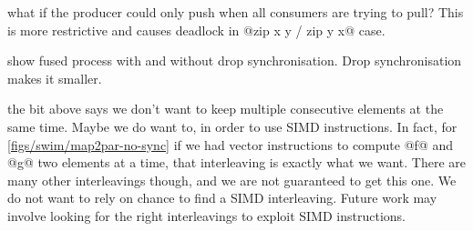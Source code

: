  what if the producer could only push when all consumers are trying to pull?
This is more restrictive and causes deadlock in @zip x y / zip y x@ case.

 show fused process with and without drop synchronisation. Drop synchronisation makes it smaller.

 the bit above says we don't want to keep multiple consecutive elements at the same time.
Maybe we do want to, in order to use SIMD instructions.
In fact, for \autoref{figs/swim/map2par-no-sync} if we had vector instructions to compute @f@ and @g@ two elements at a time, that interleaving is exactly what we want.
There are many other interleavings though, and we are not guaranteed to get this one.
We do not want to rely on chance to find a SIMD interleaving.
Future work may involve looking for the right interleavings to exploit SIMD instructions.


